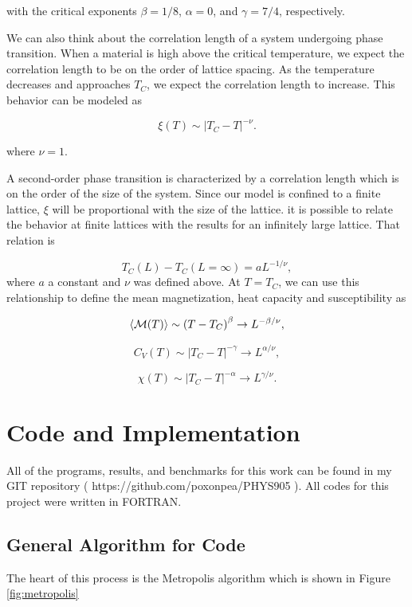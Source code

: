 \documentclass[%
oneside,                 %
final,                   %
10pt]{article}
\begin{document}
with the critical exponents $\beta=1/8$, $\alpha = 0$, and $\gamma = 7/4$, respectively.

We can also think about the correlation length of a system undergoing phase transition.  When a material is high above the critical temperature, we expect the correlation length to be on the order of lattice spacing.  As the temperature decreases and approaches $T_C$, we expect the correlation length to increase. This behavior can be modeled as 

\[
  \xi(T) \sim \left|T_C-T\right|^{-\nu}.
\]

where $\nu=1$.

A second-order phase transition is characterized by a
correlation length which is on the order of the size of the system.
Since our model is confined to a finite lattice, $\xi$ will
be proportional with the size of the lattice.  it is possible to relate the behavior at finite lattices with the results for an infinitely large lattice.
That relation is

\begin{equation}
 T_C(L)-T_C(L=\infty) = aL^{-1/\nu},
\end{equation}
where $a$ a constant and  $\nu$ was defined above.
At $T=T_C$, we can use this relationship to define the mean magnetization, heat capacity and susceptibility as

\[
  \langle {\cal M}(T) \rangle \sim \left(T-T_C\right)^{\beta}
  \rightarrow L^{-\beta/\nu},
\]

\[
  C_V(T) \sim \left|T_C-T\right|^{-\gamma} \rightarrow L^{\alpha/\nu},
\]

\[
  \chi(T) \sim \left|T_C-T\right|^{-\alpha} \rightarrow L^{\gamma/\nu}.
\]


\section{Code and Implementation}

All of the programs, results, and benchmarks for this work can be found in my GIT repository ( https://github.com/poxonpea/PHYS905 ).  All codes for this project were written in FORTRAN.

\subsection{General Algorithm for Code}

The heart of this process is the Metropolis algorithm which is shown in Figure \ref{fig:metropolis}
\end{document}
